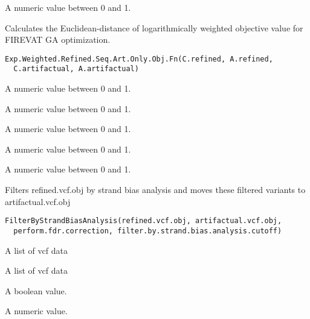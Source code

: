 \documentclass[letterpaper]{book}
\begin{document}
%
\begin{Value}
A numeric value between 0 and 1.
\end{Value}
%
\begin{Description}\relax
Calculates the Euclidean-distance of logarithmically weighted
objective value for FIREVAT GA optimization.
\end{Description}
%
\begin{Usage}
\begin{verbatim}
Exp.Weighted.Refined.Seq.Art.Only.Obj.Fn(C.refined, A.refined,
  C.artifactual, A.artifactual)
\end{verbatim}
\end{Usage}
%
\begin{Arguments}
\begin{ldescription}
\item[\code{C.refined}] A numeric value between 0 and 1.

\item[\code{A.refined}] A numeric value between 0 and 1.

\item[\code{C.artifactual}] A numeric value between 0 and 1.

\item[\code{A.artifactual}] A numeric value between 0 and 1.
\end{ldescription}
\end{Arguments}
%
\begin{Value}
A numeric value between 0 and 1.
\end{Value}
%
\begin{Description}\relax
Filters refined.vcf.obj by strand bias analysis and
moves these filtered variants to artifactual.vcf.obj
\end{Description}
%
\begin{Usage}
\begin{verbatim}
FilterByStrandBiasAnalysis(refined.vcf.obj, artifactual.vcf.obj,
  perform.fdr.correction, filter.by.strand.bias.analysis.cutoff)
\end{verbatim}
\end{Usage}
%
\begin{Arguments}
\begin{ldescription}
\item[\code{refined.vcf.obj}] A list of vcf data

\item[\code{artifactual.vcf.obj}] A list of vcf data

\item[\code{perform.fdr.correction}] A boolean value.

\item[\code{filter.by.strand.bias.analysis.cutoff}] A numeric value.
\end{ldescription}
\end{Arguments}
\end{document}
